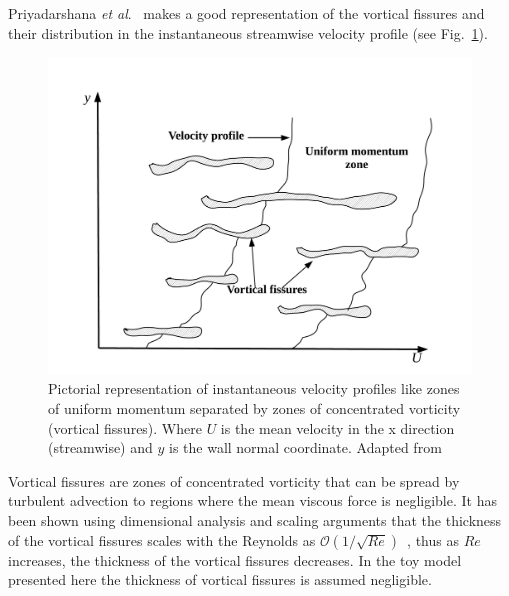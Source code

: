\documentclass[aps,reprint,amsmath,amssymb,pra]{revtex4-1}%
\begin{document}
Priyadarshana \textit{et al}.~\citep{priya2007} makes a good representation of the vortical fissures and their distribution in the instantaneous streamwise velocity profile (see Fig.~\ref{fig:vortical_fissures}). 
\begin{figure}[b]
\includegraphics[scale=0.305]{figures/uniform_velocity_vortical_fissures}
\caption{\label{fig:vortical_fissures} Pictorial representation of instantaneous velocity profiles like zones of uniform momentum separated by zones of concentrated vorticity (vortical fissures). Where $U$ is the mean velocity in the x direction (streamwise) and $y$ is the wall normal coordinate.
Adapted from~\citep{priya2007}}
\end{figure} 
Vortical fissures are zones of concentrated vorticity that can
be spread by turbulent advection to regions where the mean viscous force is negligible. It has been shown using dimensional
analysis and scaling arguments that the thickness of the vortical fissures scales with the Reynolds as $\mathcal{O}(1/\sqrt{Re})$~\citep{tennekes1968}, thus as $Re$ increases, the thickness of the vortical fissures decreases. In the toy model presented here the thickness of vortical fissures is assumed negligible.
\end{document}
